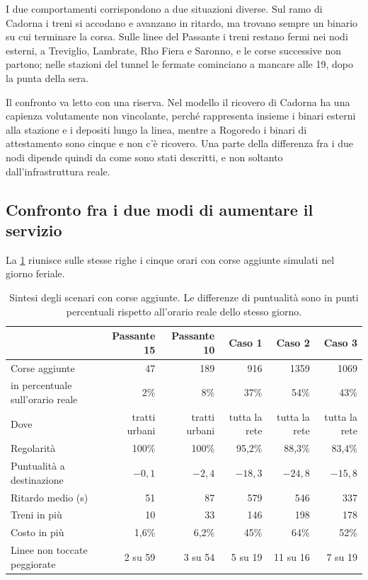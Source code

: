 I due comportamenti corrispondono a due situazioni diverse. Sul ramo di Cadorna i treni si accodano e avanzano in ritardo, ma trovano sempre un binario su cui terminare la corsa. Sulle linee del Passante i treni restano fermi nei nodi esterni, a Treviglio, Lambrate, Rho Fiera e Saronno, e le corse successive non partono; nelle stazioni del tunnel le fermate cominciano a mancare alle 19, dopo la punta della sera.

Il confronto va letto con una riserva. Nel modello il ricovero di Cadorna ha una capienza volutamente non vincolante, perché rappresenta insieme i binari esterni alla stazione e i depositi lungo la linea, mentre a Rogoredo i binari di attestamento sono cinque e non c'è ricovero. Una parte della differenza fra i due nodi dipende quindi da come sono stati descritti, e non soltanto dall'infrastruttura reale.

\subsection{Confronto fra i due modi di aumentare il servizio}
La \cref{tab:risultati-sintesi} riunisce sulle stesse righe i cinque orari con corse aggiunte simulati nel giorno feriale.

\begin{table}[H]
	\centering
	\caption{Sintesi degli scenari con corse aggiunte. Le differenze di puntualità sono in punti percentuali rispetto all'orario reale dello stesso giorno.}
	\label{tab:risultati-sintesi}
	\small
	\begin{tabularx}{\textwidth}{Xrrrrr}
		\toprule
		 & Passante 15 & Passante 10 & Caso 1 & Caso 2 & Caso 3 \\
		\midrule
		Corse aggiunte & 47 & 189 & 916 & 1359 & 1069 \\
		\quad in percentuale sull'orario reale & 2\% & 8\% & 37\% & 54\% & 43\% \\
		Dove & tratti urbani & tratti urbani & tutta la rete & tutta la rete & tutta la rete \\
		Regolarità & 100\% & 100\% & 95,2\% & 88,3\% & 83,4\% \\
		Puntualità a destinazione & $-0{,}1$ & $-2{,}4$ & $-18{,}3$ & $-24{,}8$ & $-15{,}8$ \\
		Ritardo medio (s) & 51 & 87 & 579 & 546 & 337 \\
		Treni in più & 10 & 33 & 146 & 198 & 178 \\
		Costo in più & 1,6\% & 6,2\% & 45\% & 64\% & 52\% \\
		Linee non toccate peggiorate & 2 su 59 & 3 su 54 & 5 su 19 & 11 su 16 & 7 su 19 \\
		\bottomrule
	\end{tabularx}
\end{table}

